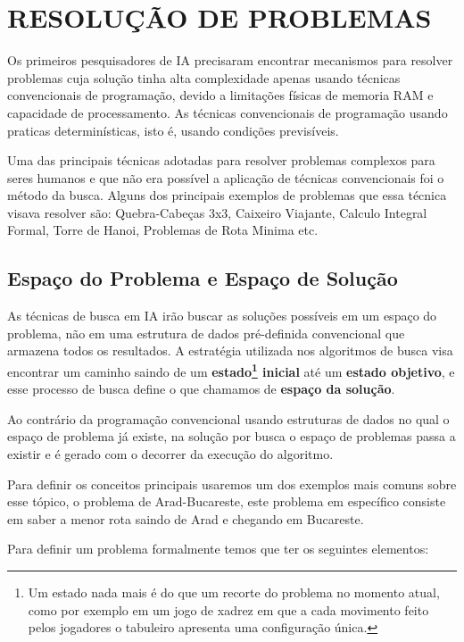 \chapter{RESOLUÇÃO DE PROBLEMAS}

Os primeiros pesquisadores de IA precisaram encontrar mecanismos para resolver problemas cuja solução tinha alta complexidade apenas usando técnicas convencionais de programação, devido a limitações físicas de memoria RAM e capacidade de processamento. As técnicas convencionais de programação usando praticas determinísticas, isto é, usando condições previsíveis.

Uma das principais técnicas adotadas para resolver problemas complexos para seres humanos e que não era possível a aplicação de técnicas convencionais foi o método da busca. Alguns dos principais exemplos de problemas que essa técnica visava resolver são: Quebra-Cabeças 3x3, Caixeiro Viajante, Calculo Integral Formal, Torre de Hanoi, Problemas de Rota Minima etc.

\section{Espaço do Problema e Espaço de Solução} 
As técnicas de busca em IA irão buscar as soluções possíveis em um espaço do problema, não em uma estrutura de dados pré-definida convencional que armazena todos os resultados. A estratégia utilizada nos algoritmos de busca visa encontrar um caminho saindo de um \textbf{estado\footnote{Um estado nada mais é do que um recorte do problema no momento atual, como por exemplo em um jogo de xadrez em que a cada movimento feito pelos jogadores o tabuleiro apresenta uma configuração única.} inicial} até um \textbf{estado objetivo}, e esse processo de busca define o que chamamos de \textbf{espaço da solução}. 

Ao contrário da programação convencional usando estruturas de dados no qual o espaço de problema já existe, na solução por busca o espaço de problemas passa a existir e é gerado com o decorrer da execução do algoritmo. 

Para definir os conceitos principais usaremos um dos exemplos mais comuns sobre esse tópico, o problema de Arad-Bucareste, este problema em específico consiste em saber a menor rota saindo de Arad e chegando em Bucareste. 



Para definir um problema formalmente temos que ter os seguintes elementos:

